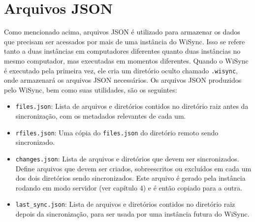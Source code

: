 \documentclass[12pt,a4paper]{ufpr}
\begin{document}
\section{Arquivos JSON}
Como mencionado acima, arquivos JSON é utilizado para armazenar os dados que precisam ser acessados por mais de uma instância do WiSync.
Isso se refere tanto a duas instâncias em computadores diferentes quanto duas instâncias no mesmo computador, mas executadas em momentos diferentes.
Quando o WiSync é executado pela primeira vez, ele cria um diretório oculto chamado \texttt{.wisync}, onde armazenará os arquivos JSON necessários.
Os arquivos JSON produzidos pelo WiSync, bem como suas utilidades, são os seguintes:
\begin{itemize}
  \item \texttt{files.json}: Lista de arquivos e diretórios contidos no diretório raiz antes da sincronização, com os metadados relevantes de cada um.
  \item \texttt{rfiles.json}: Uma cópia do \texttt{files.json} do diretório remoto sendo sincronizado.
  \item \texttt{changes.json}: Lista de arquivos e diretórios que devem ser sincronizados.
  Define arquivos que devem ser criados, sobreescritos ou excluídos em cada um dos dois diretórios sendo sincronizados.
  Este arquivo é gerado pela instância rodando em modo servidor (ver capítulo 4) e é então copiado para a outra.
  \item \texttt{last\_sync.json}: Lista de arquivos e diretórios contidos no diretório raiz depois da sincronização, para ser usada por uma instância futura do WiSync.

\end{itemize}
\end{document}
